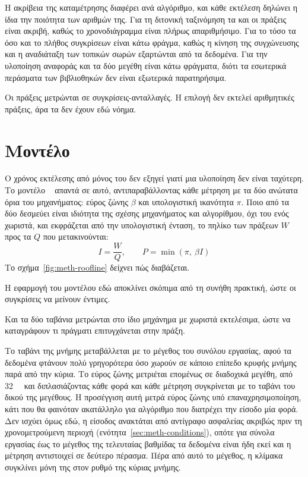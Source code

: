 Η ακρίβεια της καταμέτρησης διαφέρει ανά αλγόριθμο, και κάθε εκτέλεση δηλώνει η
ίδια την ποιότητα των αριθμών της. Για τη διτονική ταξινόμηση τα  και
οι πράξεις είναι ακριβή, καθώς το χρονοδιάγραμμα είναι πλήρως απαριθμήσιμο. Για
το  τόσο τα  όσο και το πλήθος συγκρίσεων είναι κάτω
φράγμα, καθώς η κίνηση της συγχώνευσης και η αναδιάταξη των τοπικών σωρών
εξαρτώνται από τα δεδομένα. Για την υλοποίηση αναφοράς και τα δύο μεγέθη είναι
κάτω φράγματα, διότι τα εσωτερικά περάσματα των βιβλιοθηκών δεν είναι εξωτερικά
παρατηρήσιμα.

Οι πράξεις μετρώνται σε συγκρίσεις-ανταλλαγές. Η επιλογή  δεν εκτελεί
αριθμητικές πράξεις, άρα τα  δεν έχουν εδώ νόημα.

\section{Μοντέλο }
\label{sec:meth-roofline}

Ο χρόνος εκτέλεσης από μόνος του δεν εξηγεί γιατί μια υλοποίηση δεν είναι
ταχύτερη. Το μοντέλο ~\cite{williams2009} απαντά σε αυτό,
αντιπαραβάλλοντας κάθε μέτρηση με τα δύο ανώτατα όρια του μηχανήματος: εύρος
ζώνης $\beta$ και υπολογιστική ικανότητα $\pi$. Ποιο από τα δύο δεσμεύει είναι
ιδιότητα της σχέσης μηχανήματος και αλγορίθμου, όχι του ενός χωριστά, και
εκφράζεται από την υπολογιστική ένταση, το πηλίκο των πράξεων $W$ προς τα
 $Q$ που μετακινούνται: \[ I = \frac{W}{Q}, \qquad P = \min(\pi,\
\beta I) \] Το σχήμα~\ref{fig:meth-roofline} δείχνει πώς διαβάζεται.



Η εφαρμογή του μοντέλου εδώ αποκλίνει σκόπιμα από τη συνήθη πρακτική, ώστε οι
συγκρίσεις να μείνουν έντιμες.

Και τα δύο ταβάνια μετρώνται στο ίδιο μηχάνημα με χωριστά εκτελέσιμα, ώστε να
καταγράφουν τι πράγματι επιτυγχάνεται στην πράξη.

Το ταβάνι της μνήμης μεταβάλλεται με το μέγεθος του συνόλου εργασίας, αφού τα
δεδομένα φτάνουν πολύ γρηγορότερα όσο χωρούν σε κάποιο επίπεδο κρυφής μνήμης
παρά από την κύρια. Το εύρος ζώνης μετριέται επομένως σε διαδοχικά μεγέθη, από
\qty{32}{\kibi\byte} και διπλασιάζοντας κάθε φορά και κάθε μέτρηση συγκρίνεται
με το ταβάνι του δικού της μεγέθους. Η προσέγγιση αυτή μετρά εύρος ζώνης υπό
επαναχρησιμοποίηση, κάτι που θα φαινόταν ακατάλληλο για αλγόριθμο που διατρέχει
την είσοδο μία φορά. Δεν ισχύει όμως εδώ, η είσοδος ανακτάται από αντίγραφο
ασφαλείας ακριβώς πριν τη χρονομετρούμενη περιοχή
(ενότητα~\ref{sec:meth-conditions}), οπότε για σύνολα εργασίας έως το μέγεθος
της τελευταίας βαθμίδας τα δεδομένα είναι ήδη εκεί και η μέτρηση αντιστοιχεί σε
δεύτερο πέρασμα. Πέρα από αυτό το μέγεθος, η κλίμακα συγκλίνει μόνη της στον
ρυθμό της κύριας μνήμης.

